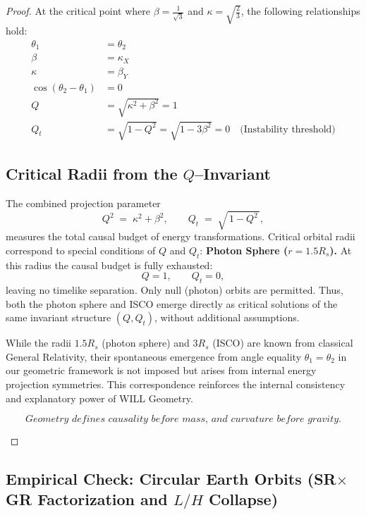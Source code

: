\documentclass[12pt, a4paper]{article}
\begin{document}
\begin{proof}
At the critical point where \(\beta = \frac{1}{\sqrt{3}}\) and \(\kappa = \sqrt{\frac{2}{3}}\), the following relationships hold:
\begin{align}
\theta_1 &= \theta_2 \\
\beta &= \kappa_X \\
\kappa &= \beta_Y \\
\cos(\theta_{2}-\theta_{1}) &= 0 \\
 Q &=\sqrt{\kappa^2 + \beta^2}=1 \\
Q_t &= \sqrt{1-Q^2} =\sqrt{1-3\beta^2} = 0 \quad \text{(Instability threshold)}
\end{align}

\subsection*{Critical Radii from the $Q$--Invariant}

The combined projection parameter
\[
Q^{2} \;=\; \kappa^{2} + \beta^{2}, 
\qquad Q_{t} \;=\; \sqrt{\,1 - Q^{2}\,},
\]
measures the total causal budget of energy transformations.  
Critical orbital radii correspond to special conditions of $Q$ and $Q_{t}$:
 \textbf{  Photon Sphere ($r = 1.5R_{s}$).}
    At this radius the causal budget is fully exhausted:
\[
    Q = 1, \qquad Q_{t} = 0,
    \]
    leaving no timelike separation. Only null (photon) orbits are permitted.
Thus, both the photon sphere and ISCO emerge directly as critical solutions of the same invariant structure $(Q,Q_t)$, without additional assumptions.


\begin{tcolorbox}[colback=gray!5,colframe=black!40!black,title=Interpretive Note]
While the radii \(1.5R_s\) (photon sphere) and \(3R_s\) (ISCO) are known from classical General Relativity, their spontaneous emergence from angle equality \(\theta_1 = \theta_2\) in our geometric framework is not imposed but arises from internal energy projection symmetries. This correspondence reinforces the internal consistency and explanatory power of WILL Geometry.
\end{tcolorbox}

\begin{tcolorbox}[colback=gray!5, colframe=black!80!black, title=Projectional Principle]
\[
\textit{Geometry defines causality before mass, and curvature before gravity.}
\]
\end{tcolorbox}
\end{proof}

\subsection{Empirical Check: Circular Earth Orbits (SR$\times$GR Factorization and $L/H$ Collapse)}
\end{document}
